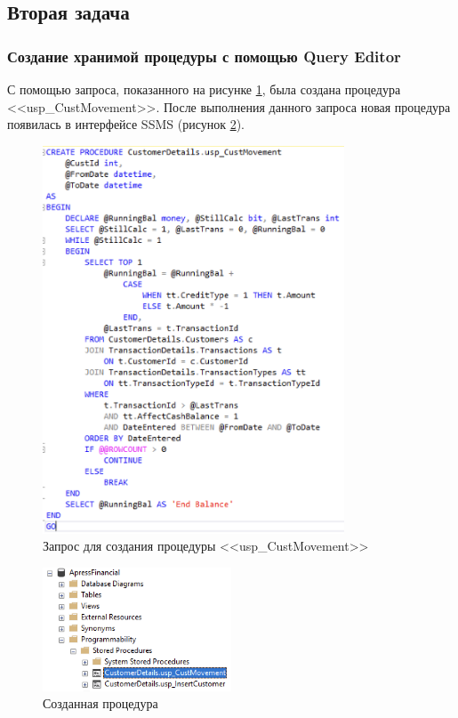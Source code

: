 \documentclass[a4paper, 14pt]{extarticle}
\begin{document}
\subsection{Вторая задача}

\subsubsection{Создание хранимой процедуры с помощью Query Editor}

С помощью запроса, показанного на рисунке \ref{fig:task-2-1}, была создана
процедура <<\foreignlanguage{english}{usp\_CustMovement}>>. После выполнения
данного запроса новая процедура появилась в интерфейсе SSMS (рисунок
\ref{fig:task-2-2}).

\begin{figure}[H]
  \centering
  \includegraphics[width=0.8\textwidth]{images/task-2/1.png}
  \caption{
    Запрос для создания процедуры
    <<\foreignlanguage{english}{usp\_CustMovement}>>
  }
  \label{fig:task-2-1}
\end{figure}

\begin{figure}[H]
  \centering
  \includegraphics[width=0.5\textwidth]{images/task-2/2.png}
  \caption{Созданная процедура}
  \label{fig:task-2-2}
\end{figure}
\end{document}
